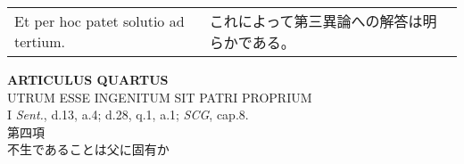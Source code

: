 \documentclass[10pt]{jsarticle} %
\begin{document}
\begin{longtable}{p{21em}p{21em}}
\\



Et per hoc patet solutio ad tertium.

&

これによって第三異論への解答は明らかである。

\\



\end{longtable}
\newpage


\begin{center}
{\Large {\bf ARTICULUS QUARTUS}}\\
{\large UTRUM ESSE INGENITUM SIT PATRI PROPRIUM}\\
{\footnotesize I {\itshape Sent.}, d.13, a.4; d.28, q.1, a.1;
 {\itshape SCG}, cap.8.}\\
{\Large 第四項\\不生であることは父に固有か}
\end{center}
\end{document}
